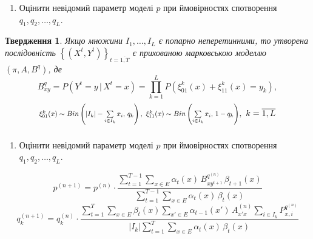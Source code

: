 \documentclass[12pt,mathserif]{beamer}
\newcommand*{\scaleq}[2][4]{\scalebox{#1}{$#2$}}
\theoremstyle{plain}
\newtheorem{claim}{\indent Твердження}
\begin{document}
\begin{frame}[t]
    \frametitle{\insertsection}
    \begin{enumerate}[3]
        \item Оцінити невідомий параметр моделі $p$ при ймовірностях спотворення $q_1,q_2,\ldots,q_L$.
    \end{enumerate}
    \vspace{0.5cm}

    \begin{claim}
        Якщо множини $I_1,\ldots,I_L$ є попарно неперетинними, то утворена послідовність $\left\{ \left( X^t,Y^t \right) \right\}_{t=\overline{1,T}}$ є прихованою марковською моделлю $\left( \pi,A,B^q \right)$, де 
        \begin{equation*}
            B^q_{xy} = P\left( Y^t=y\,|\,X^t=x \right) = \prod\limits_{k=1}^{L} P\left( \xi^k_{01}(x) + \xi^k_{11}(x) = y_k \right),
        \end{equation*}
        \begin{equation*}\scaleq[0.82]{
            \xi^k_{01}(x) \sim Bin\left( |I_k| - \sum\limits_{i \in I_k} x_i,\, q_k \right),\ \xi^k_{11}(x) \sim Bin\left( \sum\limits_{i \in I_k} x_i,\, 1 - q_k \right)},\ k=\overline{1,L}
        \end{equation*}
    \end{claim}
\end{frame}

\begin{frame}[t]
    \frametitle{\insertsection}
    \begin{enumerate}[3]
        \item Оцінити невідомий параметр моделі $p$ при ймовірностях спотворення $q_1,q_2,\ldots,q_L$.
    \end{enumerate}
    \vspace{0.5cm}

    \begin{equation*}
        p^{(n+1)} = p^{(n)}\cdot\frac{\sum\limits_{t=1}^{T-1}\sum\limits_{x \in E} \alpha_t(x)\,B^{q^{(n)}}_{xy^{t+1}}\,\beta_{t+1}(x)}{\sum\limits_{t=1}^{T-1}\sum\limits_{x \in E} \alpha_t(x)\,\beta_t(x)}
    \end{equation*}
    \begin{equation*}
        q_k^{(n+1)} = q_k^{(n)}\cdot\frac{\sum\limits_{t=1}^{T}\sum\limits_{x \in E}\beta_{t}(x)\sum\limits_{x' \in E} \alpha_{t-1}(x')\,A^{(n)}_{x'x}\sum\limits_{i \in I_k}P^{q^{(n)}}_{x,i}}{|I_k|\sum\limits_{t=1}^{T}\sum\limits_{x \in E} \alpha_t(x)\,\beta_t(x)}
    \end{equation*}
\end{frame}
\end{document}
